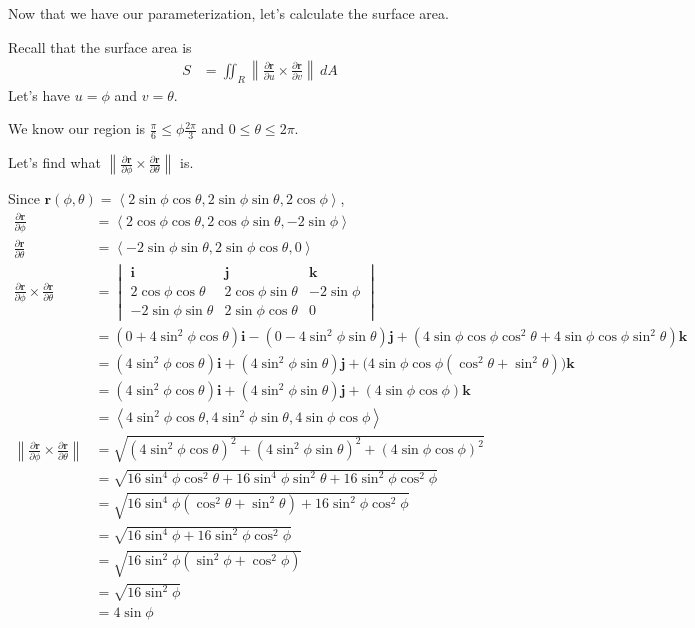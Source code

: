 \documentclass{article}
\newcommand{\lrp}[1]{\left( #1 \right)}
\newcommand{\lra}[1]{\left\langle #1 \right\rangle}
\newcommand{\norm}[1]{\left\lVert #1 \right\rVert}
\renewcommand{\i}[0]{\mathbf{i}}
\renewcommand{\j}[0]{\mathbf{j}}
\renewcommand{\k}[0]{\mathbf{k}}
\renewcommand{\r}[0]{\mathbf{r}}
\begin{document}
Now that we have our parameterization, let's calculate the surface area.

Recall that the surface area is
\begin{align*}
    S&=\iint_R \norm{\frac{\partial \r}{\partial u}\times \frac{\partial \r}{\partial v}}\,dA
\end{align*}
Let's have $u=\phi$ and $v=\theta$.

We know our region is $\displaystyle \frac{\pi}{6}\leq \phi \frac{2\pi}{3}$ and $0\leq \theta\leq 2\pi$.

Let's find what $\displaystyle\norm{\frac{\partial \r}{\partial \phi}\times \frac{\partial \r}{\partial \theta}} $ is.

Since $\displaystyle \r(\phi,\theta)=\lra{2\sin\phi\cos\theta,2\sin\phi\sin\theta,2\cos\phi}$,
\begin{align*}
    \frac{\partial \r}{\partial \phi}&=\lra{2\cos\phi\cos\theta, 2\cos\phi\sin\theta, -2\sin\phi}\\
    \frac{\partial \r}{\partial \theta}&=\lra{-2\sin\phi\sin\theta,2\sin\phi\cos\theta ,0}\\
    \frac{\partial \r}{\partial \phi}\times \frac{\partial \r}{\partial \theta}&=\begin{vmatrix}
    \i & \j &\k\\
    2\cos\phi\cos\theta & 2\cos\phi\sin\theta & -2\sin\phi\\
    -2\sin\phi\sin\theta & 2\sin\phi\cos\theta &0
    \end{vmatrix}\\
    &=\lrp{0+4\sin^2\phi\cos\theta}\i-\lrp{0-4\sin^2\phi\sin\theta}\j+\lrp{4\sin\phi\cos\phi\cos^2\theta +4\sin\phi\cos\phi\sin^2\theta}\k\\
    &=\lrp{4\sin^2\phi\cos\theta}\i+\lrp{4\sin^2\phi\sin\theta}\j+\Big(4\sin\phi\cos\phi\lrp{\cos^2\theta+\sin^2\theta}\Big)\k\\
    &=\lrp{4\sin^2\phi\cos\theta}\i+\lrp{4\sin^2\phi\sin\theta}\j+\lrp{4\sin\phi\cos\phi}\k\tag{$\cos^2\theta+\sin^2\theta=1$}\\
    &=\lra{4\sin^2\phi\cos\theta,4\sin^2\phi\sin\theta,4\sin\phi\cos\phi}\\
    \norm{\frac{\partial \r}{\partial \phi}\times \frac{\partial \r}{\partial \theta}}&=\sqrt{\lrp{4\sin^2\phi\cos\theta}^2+\lrp{4\sin^2\phi\sin\theta}^2+\lrp{4\sin\phi\cos\phi}^2}\\
    &=\sqrt{16\sin^4\phi\cos^2\theta+16\sin^4\phi\sin^2\theta+16\sin^2\phi\cos^2\phi}\\
    &=\sqrt{16\sin^4\phi\lrp{\cos^2\theta+\sin^2\theta}+16\sin^2\phi\cos^2\phi}\\
    &=\sqrt{16\sin^4\phi+16\sin^2\phi\cos^2\phi}\tag{$\cos^2\theta+\sin^2\theta=1$}\\
    &=\sqrt{16\sin^2\phi\lrp{\sin^2\phi+\cos^2\phi}}\\
    &=\sqrt{16\sin^2\phi}\tag{$\sin^2\phi+\cos^2\phi=1$}\\
    &=4\sin\phi\tag{ok to drop abs since $111$}
\end{align*}
\end{document}
